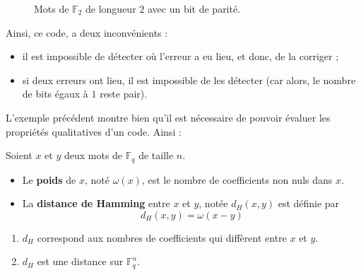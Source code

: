 \begin{example}
\begin{minipage}{0.45\textwidth}
\begin{figure}[H]
\begin{center}
\begin{tikzpicture}[scale=2]
          \end{tikzpicture}
        \end{center}
        \caption{Mots de $\mathbb{F}_2$ de longueur $2$ avec un bit de parité.}
      \end{figure}
    \end{minipage}
    \newpar
    Ainsi, ce code, a deux inconvénients :
    \begin{itemize}
      \item il est impossible de détecter où l'erreur a eu lieu, et donc, de la corriger ;
      \item si deux erreurs ont lieu, il est impossible de les détecter (car alors, le nombre de bits égaux à $1$ reste pair).
    \end{itemize}
  \end{example}

  L'exemple précédent montre bien qu'il est nécessaire de pouvoir évaluer les propriétés qualitatives d'un code. Ainsi :

  \begin{definition}
    Soient $x$ et $y$ deux mots de $\mathbb{F}_q$ de taille $n$.
    \begin{itemize}
      \item Le \textbf{poids} de $x$, noté $\omega(x)$, est le nombre de coefficients non nuls dans $x$.
      \item La \textbf{distance de Hamming} entre $x$ et $y$, notée $d_H(x,y)$ est définie par
      \[ d_H(x,y) = \omega(x-y) \]
    \end{itemize}
  \end{definition}

  \begin{proposition}
    \begin{enumerate}[label=(\roman*)]
      \item $d_H$ correspond aux nombres de coefficients qui diffèrent entre $x$ et $y$.
      \item $d_H$ est une distance sur $\mathbb{F}_q^n$.
    \end{enumerate}
  \end{proposition}

